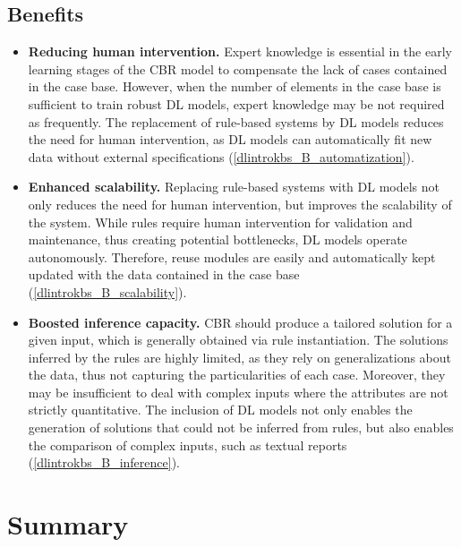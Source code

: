 \subsection{Benefits}
\begin{itemize}
    \item \textbf{Reducing human intervention.} Expert knowledge is essential in the early learning stages of the CBR model to compensate the lack of cases contained in the case base. However, when the number of elements in the case base is sufficient to train robust DL models, expert knowledge may be not required as frequently. The replacement of rule-based systems by DL models reduces the need for human intervention, as DL models can automatically fit new data without external specifications (\ref{dlintrokbs_B_automatization}).
    
    \item \textbf{Enhanced scalability.} Replacing rule-based systems with DL models not only reduces the need for human intervention, but improves the scalability of the system. While rules require human intervention for validation and maintenance, thus creating potential bottlenecks, DL models operate autonomously. Therefore, reuse modules are easily and automatically kept updated with the data contained in the case base (\ref{dlintrokbs_B_scalability}).
    
    \item \textbf{Boosted inference capacity.} CBR should produce a tailored solution for a given input, which is generally obtained via rule instantiation. The solutions inferred by the rules are highly limited, as they rely on generalizations about the data, thus not capturing the particularities of each case. Moreover, they may be insufficient to deal with complex inputs where the attributes are not strictly quantitative. The inclusion of DL models not only enables the generation of solutions that could not be inferred from rules, but also enables the comparison of complex inputs, such as textual reports (\ref{dlintrokbs_B_inference}).
\end{itemize}

\section{Summary}\label{5_sec:summary}
